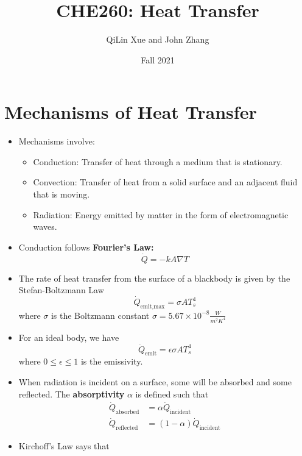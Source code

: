 \documentclass{article}
\title{CHE260: Heat Transfer}
\author{QiLin Xue and John Zhang}
\date{Fall 2021}
\begin{document}
\maketitle
\section{Mechanisms of Heat Transfer}
\begin{itemize}
        \item Mechanisms involve:
        \begin{itemize}
            \item Conduction: Transfer of heat through a medium that is stationary.
            \item Convection: Transfer of heat from a solid surface and an adjacent fluid that is moving.
            \item Radiation: Energy emitted by matter in the form of electromagnetic waves.
        \end{itemize}
        \item Conduction follows \textbf{Fourier's Law:}
        \begin{equation}
            \dot{Q} = - k A \nabla T
        \end{equation}
        \item The rate of heat transfer from the surface of a blackbody is given by the Stefan-Boltzmann Law 
        \begin{equation}
            \dot{Q}_\text{emit,max} = \sigma A T_s^4
        \end{equation}
        where $\sigma$ is the Boltzmann constant $\sigma = 5.67 \times 10^{-8} \frac{W}{m^2 K^4}$
        \item For an ideal body, we have
        \begin{equation}
            \dot{Q}_\text{emit} = \epsilon \sigma AT_s^4
        \end{equation}
        where $0 \le \epsilon \le 1$ is the emissivity.
        \item When radiation is incident on a surface, some will be absorbed and some reflected. The \textbf{absorptivity} $\alpha$ is defined such that
        \begin{align}
            \dot{Q}_\text{absorbed} &= \alpha \dot{Q}_\text{incident} \\ 
            \dot{Q}_\text{reflected} &= (1-\alpha)\dot{Q}_\text{incident}
        \end{align}
        \item Kirchoff's Law says that

\end{itemize}
\end{document}
